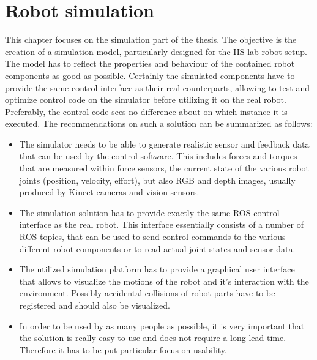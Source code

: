
\chapter{Robot simulation}
\label{chap:simulation}

This chapter focuses on the simulation part of the thesis. The objective is the creation of a simulation model, particularly designed for the IIS lab robot setup. The model has to reflect the properties and behaviour of the contained robot components as good as possible. Certainly the simulated components have to provide the same control interface as their real counterparts, allowing to test and optimize control code on the simulator before utilizing it on the real robot. Preferably, the control code sees no difference about on which instance it is executed. The recommendations on such a solution can be summarized as follows: 

\begin{itemize}

\item
The simulator needs to be able to generate realistic sensor and feedback data that can be used by the control software. This includes forces and torques that are measured within force sensors, the current state of the various robot joints (position, velocity, effort), but also RGB and depth images, usually produced by Kinect cameras and vision sensors.

\item
The simulation solution has to provide exactly the same ROS control interface as the real robot. This interface essentially consists of a number of ROS topics, that can be used to send control commands to the various different robot components or to read actual joint states and sensor data.
 
\item
The utilized simulation platform has to provide a graphical user interface that allows to visualize the motions of the robot and it's interaction with the environment. Possibly accidental collisions of  robot parts have to be registered and should also be visualized.

\item
In order to be used by as many people as possible, it is very important that the solution is really easy to use and does not require a long lead time. Therefore it has to be put particular focus on usability.

\end{itemize}


